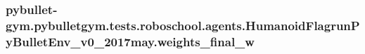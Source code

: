\subsubsection[{\texorpdfstring{weights\+\_\+final\+\_\+w}{weights_final_w}}]{\setlength{\rightskip}{0pt plus 5cm}pybullet-\/gym.\+pybulletgym.\+tests.\+roboschool.\+agents.\+Humanoid\+Flagrun\+Py\+Bullet\+Env\+\_\+v0\+\_\+2017may.\+weights\+\_\+final\+\_\+w}\hypertarget{namespacepybullet-gym_1_1pybulletgym_1_1tests_1_1roboschool_1_1agents_1_1_humanoid_flagrun_py_bullet_env__v0__2017may_a0980fddc791ced2c83cd0747707833dd}{}\label{namespacepybullet-gym_1_1pybulletgym_1_1tests_1_1roboschool_1_1agents_1_1_humanoid_flagrun_py_bullet_env__v0__2017may_a0980fddc791ced2c83cd0747707833dd}
